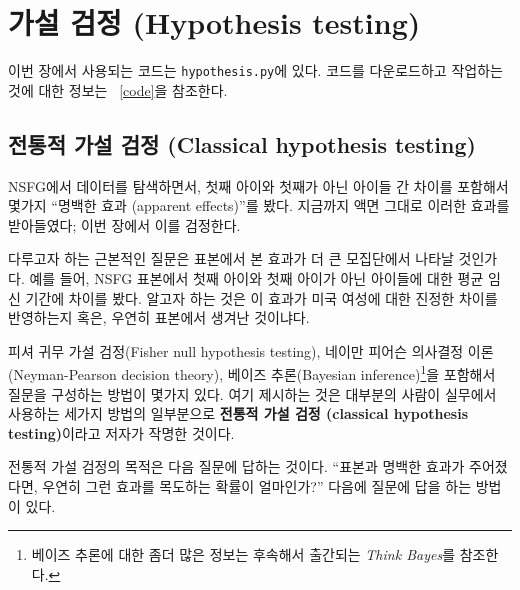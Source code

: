 

\chapter{가설 검정 (Hypothesis testing)}
\label{testing}

이번 장에서 사용되는 코드는 {\tt hypothesis.py}에 있다.
코드를 다운로드하고 작업하는 것에 대한 정보는 ~\ref{code}을 참조한다.


\section{전통적 가설 검정 (Classical hypothesis testing)}

NSFG에서 데이터를 탐색하면서, 첫째 아이와 첫째가 아닌 아이들 간 차이를 
포함해서 몇가지 ``명백한 효과 (apparent effects)''를 봤다.
지금까지 액면 그대로 이러한 효과를 받아들였다; 이번 장에서 이를 검정한다. 


다루고자 하는 근본적인 질문은 표본에서 본 효과가 더 큰 모집단에서 나타날 것인가다.
예를 들어, NSFG 표본에서 첫째 아이와 첫째 아이가 아닌 아이들에 대한 평균 임신 기간에
차이를 봤다. 알고자 하는 것은 이 효과가 미국 여성에 대한 진정한 차이를 반영하는지 
혹은, 우연히 표본에서 생겨난 것이냐다.

피셔 귀무 가설 검정(Fisher null hypothesis testing), 네이만 피어슨 의사결정 이론(Neyman-Pearson decision theory), 베이즈 추론(Bayesian inference)\footnote{베이즈 추론에 대한 좀더 많은 정보는 후속해서 출간되는 {\it Think Bayes}를 참조한다.}을 포함해서 질문을 구성하는 방법이 몇가지 있다.
여기 제시하는 것은 대부분의 사람이 실무에서 사용하는 세가지 방법의 일부분으로 {\bf 전통적 가설 검정 (classical hypothesis testing)}이라고 저자가 작명한 것이다.

전통적 가설 검정의 목적은 다음 질문에 답하는 것이다.
``표본과 명백한 효과가 주어졌다면, 우연히 그런 효과를 목도하는 확률이 얼마인가?''
다음에 질문에 답을 하는 방법이 있다.

